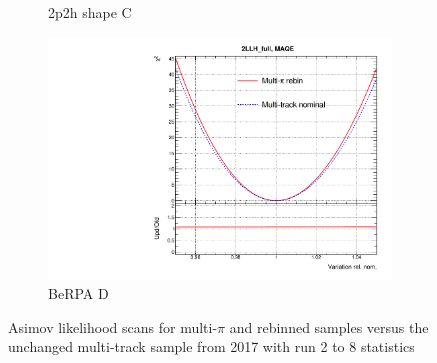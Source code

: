 \begin{figure}[h]
\begin{subfigure}[t]{0.32\textwidth}
		\caption{2p2h shape C}
	\end{subfigure}
	\begin{subfigure}[t]{0.32\textwidth}
		\includegraphics[width=\textwidth,page=6, trim={0mm 0mm 0mm 9mm}, clip]{figures/mach3/2018/llh/MultiPi_vs_MultiTrack_TotalLLH}
		\caption{BeRPA D}
	\end{subfigure}
\caption{Asimov likelihood scans for multi-$\pi$ and rebinned samples versus the unchanged multi-track sample from 2017 with run 2 to 8 statistics}
\label{fig:llh_multitrack_vs_multipi}
\end{figure}

